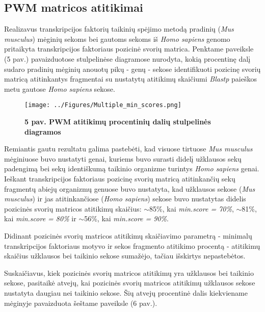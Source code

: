 \documentclass[12pt]{article}
\begin{document}
\subsection*{PWM matricos atitikimai}
Realizavus transkripcijos faktorių taikinių spėjimo metodą pradinių
(\emph{Mus musculus}) mėginių sekoms bei gautoms sekoms iš \emph{Homo sapiens}
genomo pritaikyta transkripcijos faktoriaus pozicinė svorių matrica. Penktame
paveiksle (5 pav.) pavaizduotose stulpelinėse diagramose nurodyta, kokią
procentinę dalį sudaro pradinių mėginių anouotų pikų - genų - sekose
identifikuoti pozicinę svorių matricą atitinkantys fragmentai su nustatytų
atitikimų skaičiumi \emph{Blastp} paieškos metu gautose \emph{Homo sapiens}
sekose.

\begin{figure}[H]
    \begin{center}
        \texttt{[image: ../Figures/Multiple\_min\_scores.png]}
        \vspace{-1.5\baselineskip}
        \caption*{\small\textbf{5 pav. PWM atitikimų procentinių dalių
                                stulpelinės diagramos}}
    \end{center}
\end{figure}

Remiantis gautu rezultatu galima pastebėti, kad visuose tirtuose
\emph{Mus musculus} mėginiuose buvo nustatyti genai, kuriems buvo surasti didelį
užklausos sekų padengimą bei sekų identiškumą taikinio organizme turintys
\emph{Homo sapiens} genai. Ieškant transkripcijos faktoriaus pozicinę svorių
matricą atitinkančių sekų fragmentų abiejų organizmų genuose buvo nustatyta,
kad užklausos sekose (\emph{Mus musculus}) ir jas atitinkančiose
(\emph{Homo sapiens}) sekose buvo nustatytas didelis pozicinės svorių matricos
atitikimų skaičius: \(\sim\)85\%, kai \emph{min.score = 70\%}, \(\sim\)81\%,
kai \emph{min.score = 80\%} ir \(\sim\)56\%, kai \emph{min.score = 90\%}.

Didinant pozicinės svorių matricos atitikimų skaičiavimo parametrą - minimalų
transkripcijos faktoriaus motyvo ir sekos fragmento atitikimo procentą - 
atitikimų skaičius užklausos bei taikinio sekose sumažėjo, tačiau išskirtys
nepastebėtos.

Suskaičiavus, kiek pozicinės svorių matricos atitikimų yra užklausos bei
taikinio sekose, pasitaikė atvejų, kai pozicinės svorių matricos atitikimų
užklausos sekose nustatyta daugiau nei taikinio sekose. Šių atvejų procentinė
dalis kiekviename mėginyje pavaizduota šeštame paveiksle (6 pav.).
\end{document}
